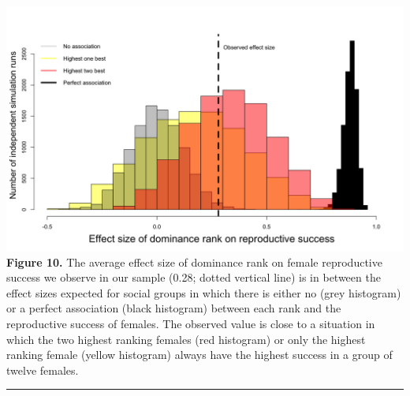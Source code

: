 \documentclass[
]{article}
\begin{document}
\includegraphics{ranksuccess_Fig10_simulatedeffectsizes.png}
\textbf{Figure 10.} The average effect size of dominance rank on female
reproductive success we observe in our sample (0.28; dotted vertical
line) is in between the effect sizes expected for social groups in which
there is either no (grey histogram) or a perfect association (black
histogram) between each rank and the reproductive success of females.
The observed value is close to a situation in which the two highest
ranking females (red histogram) or only the highest ranking female
(yellow histogram) always have the highest success in a group of twelve
females.

\begin{center}\rule{0.5\linewidth}{0.5pt}\end{center}
\end{document}
